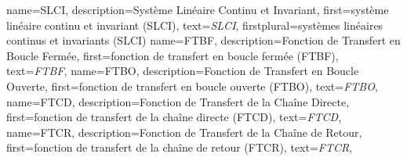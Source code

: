 {%
  name={SLCI},%
  description={Système Linéaire Continu et Invariant},%
  first={système\- lin\-éaire\- con\-tinu\- et\- in\-va\-riant\- (SLCI)},%
  text={\emph{{\scshape SLCI}}},%
  firstplural={systèmes\- linéaires\- continus\- et\- invariants\- (SLCI)}%
}
{%
  name={FTBF},%
  description={Fonction de Transfert en Boucle Fermée},%
  first={fonction de transfert en boucle fermée (FTBF)},%
  text={\emph{{\scshape FTBF}}},%
}
{%
  name={FTBO},%
  description={Fonction de Transfert en Boucle Ouverte},%
  first={fonction de transfert en boucle ouverte (FTBO)},%
  text={\emph{{\scshape FTBO}}},%
}
{%
  name={FTCD},%
  description={Fonction de Transfert de la Chaîne Directe},%
  first={fonction de transfert de la chaîne directe (FTCD)},%
  text={\emph{{\scshape FTCD}}},%
}
{%
  name={FTCR},%
  description={Fonction de Transfert de la Chaîne de Retour},%
  first={fonction de transfert de la chaîne de retour (FTCR)},%
  text={\emph{{\scshape FTCR}}},%
}
